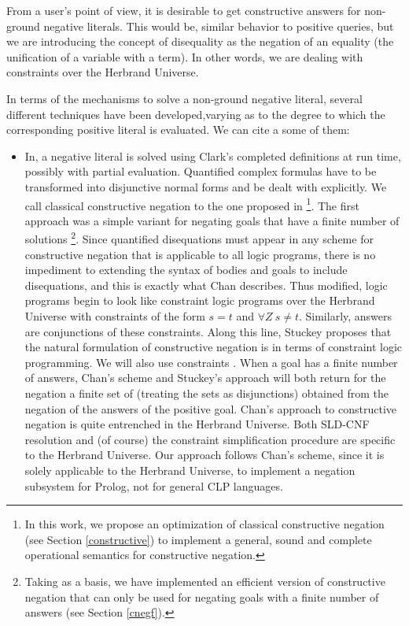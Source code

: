 \documentclass{tlp}
\begin{document}
From a user's point of view, it is desirable to get constructive
answers for non-ground negative literals. This would be, similar
behavior to positive queries, but we are introducing the concept of
disequality as the negation of an equality (the unification of a
variable with a term). In other words, we are dealing with
constraints over the Herbrand Universe.
 
In terms of the mechanisms to solve a non-ground negative literal,
several different techniques have been developed,varying as to the
degree to which the corresponding positive literal is evaluated. We
can cite a some of them:
\begin{itemize}

\item In\cite{Chan1,Chan2,Stuckey}, a negative literal is solved using
Clark's completed definitions at run time, possibly with partial
evaluation. Quantified complex formulas have to be transformed into
disjunctive normal forms and be dealt with explicitly. We call
classical constructive negation to the one proposed in
\cite{Chan2}\footnote{In this work, we propose an optimization of
classical constructive negation (see Section \ref{constructive}) to
implement a general, sound and complete operational semantics for
constructive negation.}. The first approach \cite{Chan1} was a simple
variant for negating goals that have a finite number of solutions
\footnote{Taking \cite{Chan1} as a basis, we have implemented an
efficient version of constructive negation that can only be used for
negating goals with a finite number of answers (see Section
\ref{cnegf}).}.
Since quantified disequations must appear in any scheme for
constructive negation that is applicable to all logic programs, there
is no impediment to extending the syntax of bodies and goals to
include disequations, and this is exactly what Chan describes. Thus
modified, logic programs begin to look like constraint logic programs
over the Herbrand Universe with constraints of the form $s=t$ and
$\forall Z~ s \neq t$. Similarly, answers are conjunctions of these
constraints. Along this line, Stuckey \cite{Stuckey95} proposes that
the natural formulation of constructive negation is in terms of
constraint logic programming. We will also use constraints%
. When a goal has a finite number of answers, Chan's scheme
\cite{Chan1} and Stuckey's approach \cite{Stuckey} will both return
for the negation a finite set of %
(treating the sets as disjunctions) obtained from the negation of the
answers of the positive goal.
Chan's approach to constructive negation is quite entrenched in the
Herbrand Universe. Both SLD-CNF resolution and (of course) the
constraint simplification procedure are specific to the Herbrand
Universe. Our approach follows Chan's scheme, since it is solely
applicable to the Herbrand Universe, to implement a negation subsystem
for Prolog, not for general CLP languages.


\end{itemize}
\end{document}
